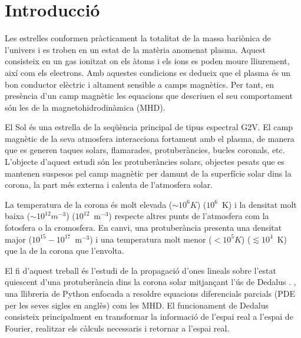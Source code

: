 \documentclass[12pt,a4paper]{article}
\numberwithin{equation}{section}
\begin{document}



\section{Introducció} \label{sec:intro}


Les estrelles conformen pràcticament la totalitat de la massa bariònica de l'univers i es troben en un estat de la matèria anomenat plasma.
Aquest consisteix en un gas ionitzat on els àtoms i els ions es poden moure lliurement, així com els electrons.
Amb aquestes condicions es dedueix que el plasma és un bon conductor elèctric i altament sensible a camps magnètics.
Per tant, en presència d'un camp magnètic les equacions que descriuen el seu comportament són les de la magnetohidrodinàmica (MHD).

El Sol és una estrella de la seqüència principal de tipus espectral G2V.
El camp magnètic de la seva atmosfera interacciona fortament amb el plasma, de manera que es generen taques solars, flamarades, protuberàncies, bucles coronals, etc.
L'objecte d'aquest estudi són les protuberàncies solars,
objectes pesats que es mantenen suspesos pel camp magnètic per damunt de la superfície solar dins la corona,
la part més externa i calenta de l'atmosfera solar.

La temperatura de la corona és molt elevada ($\sim 10^6 K$) ($10^6$~K) i la densitat molt baixa ($\sim 10^{12} m^{-3}$) ($10^12$~m$^{-3}$) respecte altres punts de l'atmosfera com la fotosfera o la cromosfera.
En canvi, una protuberància presenta una densitat major ($10^{15}-10^{17}$~m$^{-3}$) i una temperatura molt menor ($< 10^5 K$) ($\lesssim 10^4$~K) que la de la corona que l'envolta.


El fi d'aquest treball és l'estudi de la propagació d'ones lineals sobre l'estat quiescent d'una protuberància dins la corona solar mitjançant l'ús de Dedalus \parencite{Dedalus}.
, una llibreria de Python enfocada a resoldre equacions diferencials parcials (PDE per les seves sigles en anglès) com les MHD.
El funcionament de Dedalus consisteix principalment en transformar la informació de l'espai real a l'espai de Fourier,
realitzar els càlculs necessaris i retornar a l'espai real.
\end{document}
